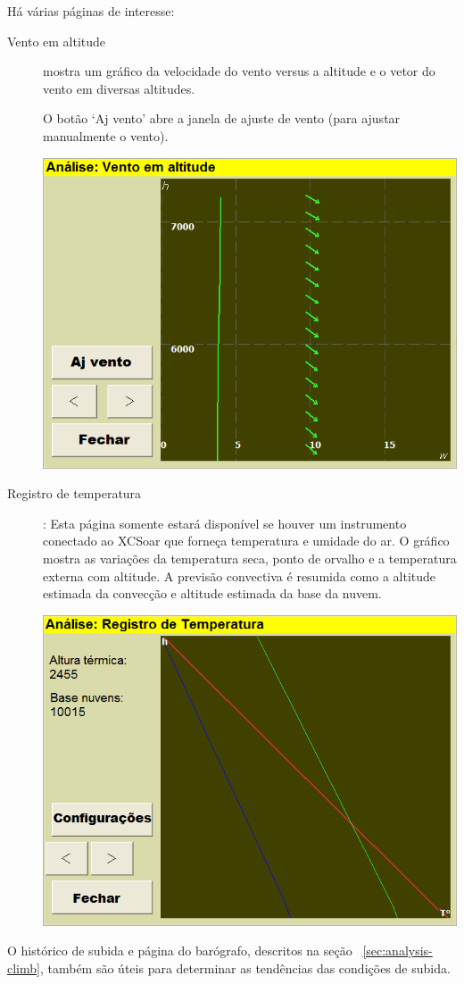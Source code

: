 Há várias páginas de interesse:  
\begin{description}

\item[Vento em altitude]
  mostra um gráfico da velocidade do vento versus a altitude e o vetor do vento em diversas altitudes.

O botão ‘Aj vento’ abre a janela de ajuste de vento (para ajustar manualmente o vento).

\begin{center}
\includegraphics[angle=0,width=0.8\linewidth,keepaspectratio='true']{figures/analysis-wind.png}
\end{center}

\item[Registro de temperatura]
  : Esta página somente estará disponível se houver um instrumento conectado ao XCSoar que forneça temperatura e umidade do ar.  O gráfico mostra as variações da temperatura seca, ponto de orvalho e a temperatura externa com altitude.  A previsão convectiva é resumida como a altitude estimada da convecção e altitude estimada da base da nuvem.  

\begin{center}
\includegraphics[angle=0,width=0.8\linewidth,keepaspectratio='true']{figures/analysis-temptrace.png}
\end{center}

\end{description}
O histórico de subida e página do barógrafo, descritos na seção ~\ref{sec:analysis-climb}, também são úteis para determinar as tendências das condições de subida.


